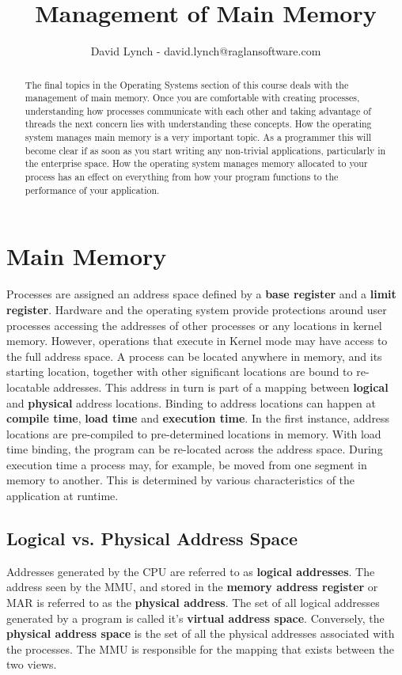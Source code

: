 \documentclass[10pt,a4paper]{article}
\title{Management of Main Memory}
\author{David Lynch - david.lynch@raglansoftware.com }
\begin{document}
\maketitle
\begin{abstract}
The final topics in the Operating Systems section of this course deals with the management of main memory. Once you are comfortable with creating processes, understanding how processes communicate with each other and taking advantage of threads the next concern lies with understanding these concepts. How the operating system manages main memory is a very important topic. As a programmer this will become clear if as soon as you start writing any non-trivial applications, particularly in the enterprise space. How the operating system manages memory allocated to your process has an effect on everything from how your program functions to the performance of your application. 
\end{abstract}
\section{Main Memory}
Processes are assigned an address space defined by a {\bf base register} and a {\bf limit register}. Hardware and the operating system provide protections around user processes accessing the addresses of other processes or any locations in kernel memory. However, operations that execute in Kernel mode may have access to the full address space. 
\newline\newline
A process can be located anywhere in memory, and its starting location, together with other significant locations are bound to re-locatable addresses. This address in turn is part of a mapping between {\bf logical} and {\bf physical} address locations. Binding to address locations can happen at {\bf compile time}, {\bf load time} and {\bf execution time}. In the first instance, address locations are pre-compiled to pre-determined locations in memory. With load time binding, the program can be re-located across the address space. During execution time a process may, for example, be moved from one segment in memory to another. This is determined by various characteristics of the application at runtime. 
\subsection{Logical vs. Physical Address Space}
Addresses generated by the CPU are referred to as {\bf logical addresses}. The address seen by the MMU, and stored in the {\bf memory address register} or MAR is referred to as the {\bf physical address}. The set of all logical addresses generated by a program is called it's {\bf virtual address space}. Conversely, the {\bf physical address space} is the set of all the physical addresses associated with the processes. The MMU is responsible for the mapping that exists between the two views. 
\end{document}
